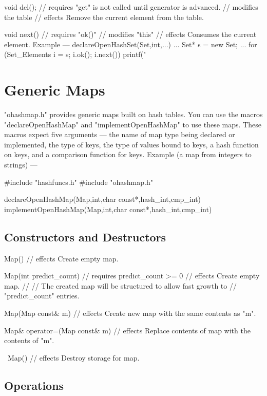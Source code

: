 void del();
    // requires "get" is not called until generator is advanced.
    // modifies the table
    // effects  Remove the current element from the table.

void next()
    // requires  "ok()"
    // modifies  "this"
    // effects   Consumes the current element.
Example ---
declareOpenHashSet(Set,int,...)
...
Set* s = new Set;
...
for (Set_Elements i = s; i.ok(); i.next())
    printf("%

\section{Generic Maps}

"ohashmap.h" provides generic maps built on hash tables.
You can use the macros "declareOpenHashMap" and "implementOpenHashMap"
to use these maps.
These macros expect five arguments --- the name of map type being declared
or implemented, the type of keys, the type of values bound to keys,
a hash function on keys, and a comparison function for keys.
Example (a map from integers to strings) ---

#include "hashfuncs.h"
#include "ohashmap.h"

declareOpenHashMap(Map,int,char const*,hash_int,cmp_int)
implementOpenHashMap(Map,int,char const*,hash_int,cmp_int)

\subsection{Constructors and Destructors}

Map()
     // effects   Create empty map.

Map(int predict_count)
     // requires  predict_count >= 0
     // effects   Create empty map.
     //
     // The created map will be structured to allow fast growth to
     // "predict_count" entries.

Map(Map const& m)
     // effects   Create new map with the same contents as "m".

Map& operator=(Map const& m)
     // effects   Replace contents of map with the contents of "m".

~Map()
     // effects   Destroy storage for map.

\subsection{Operations}


